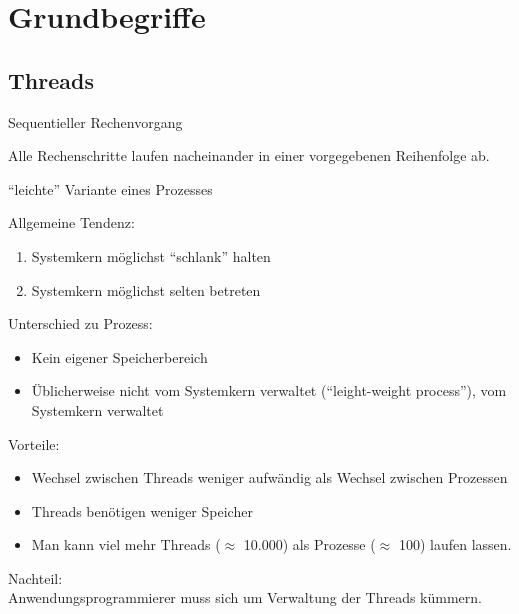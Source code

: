 \chapter{Grundbegriffe}

\section{Threads}

\begin{definition}[Prozess]
Sequentieller Rechenvorgang
\end{definition}

\begin{definition}[sequentiell]
Alle Rechenschritte laufen nacheinander in einer vorgegebenen Reihenfolge ab.
\end{definition}

\begin{definition}[Thread]
"`leichte"' Variante eines Prozesses
\end{definition}

Allgemeine Tendenz:
\begin{enumerate}
\item Systemkern möglichst "`schlank"' halten
\item Systemkern möglichst selten betreten
\end{enumerate}

Unterschied zu Prozess:
\begin{itemize}
\item Kein eigener Speicherbereich
\item Üblicherweise nicht vom Systemkern verwaltet ("`leight-weight process"'), vom Systemkern verwaltet
\end{itemize}

Vorteile:
\begin{itemize}
\item Wechsel zwischen Threads weniger aufwändig als Wechsel zwischen Prozessen
\item Threads benötigen weniger Speicher
\item Man kann viel mehr Threads ($\approx$ 10.000) als Prozesse ($\approx$ 100) laufen lassen.
\end{itemize}

Nachteil:\\
Anwendungsprogrammierer muss sich um Verwaltung der Threads kümmern.